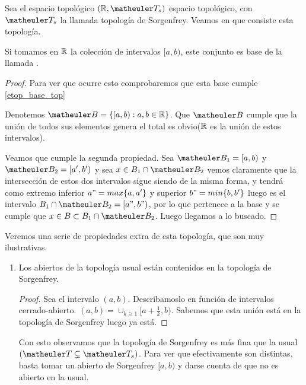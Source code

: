 \begin{exa}
	Sea el espacio topológico $(\R, \T_s)$ espacio topológico, con $\T_s$ la llamada topología de Sorgenfrey. Veamos en que consiste esta topología. 
	
	Si tomamos en $\mathbb{R}$ la colección de intervalos $[a,b)$, este conjunto es base de la llamada .
	\begin{proof}
		Para ver que ocurre esto comprobaremos que esta base cumple \ref{etop_base_top}
		
		Denotemos $\B = \{[a,b) : a,b \in \R\}$. Que $\B$ cumple que la unión de todos sus elementos genera el total es obvio($\mathbb{R}$ es la unión de estos intervalos).
		
		Veamos que cumple la segunda propiedad. Sea $\B_1=[a,b)$ y $\B_2=[a',b')$ y sea $x \in B_1 \cap \B_2$ vemos claramente que la intersección de estos dos intervalos sigue siendo de la misma forma, y tendrá como extremo inferior $a" = max\{a,a'\} $ y superior $b"=min\{b,b'\}$ luego es el intervalo $B_1 \cap \B_2 = [a",b")$, por lo que pertenece a la base y se cumple que $x \in B \subset B_1 \cap \B_2$. Luego llegamos a lo buscado.
	\end{proof}
	Veremos una serie de propiedades extra de esta topología, que son muy ilustrativas.
	\begin{enumerate}
		\item Los abiertos de la topología usual están contenidos en la topología de Sorgenfrey.
		\begin{proof}
			Sea el intervalo $(a,b)$. Describamoslo en función de intervalos cerrado-abierto. $(a,b) = \cup_{k\geq 1} [a+\frac{1}{k},b)$. Sabemos que esta unión está en la topología de Sorgenfrey luego ya está.
		\end{proof}
	Con esto observamos que la topología de Sorgenfrey es más fina que la usual $(\T \subsetneq \T_{s})$. Para ver que efectivamente son distintas, basta tomar un abierto de Sorgenfrey $[a,b)$ y darse cuenta de que no es abierto en la usual.
	

\end{enumerate}
\end{exa}
